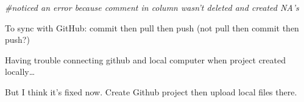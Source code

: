\documentclass[]{article}
\newenvironment{Shaded}{\begin{snugshade}}{\end{snugshade}}
\newcommand{\CommentTok}[1]{\textcolor[rgb]{0.56,0.35,0.01}{\textit{#1}}}
\begin{document}
\begin{Shaded}
\begin{Highlighting}[]
\CommentTok{#noticed an error because comment in column wasn't deleted and created NA's}
\end{Highlighting}
\end{Shaded}

To sync with GitHub: commit then pull then push (not pull then commit
then push?)

Having trouble connecting github and local computer when project created
locally\ldots{}

But I think it's fixed now. Create Github project then upload local
files there.
\end{document}
